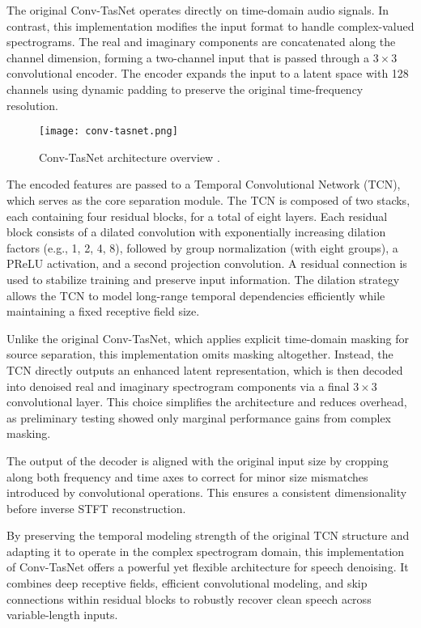 The original Conv-TasNet operates directly on time-domain audio signals. In contrast, this implementation modifies the input format to handle complex-valued spectrograms. The real and imaginary components are concatenated along the channel dimension, forming a two-channel input that is passed through a \(3 \times 3\) convolutional encoder. The encoder expands the input to a latent space with 128 channels using dynamic padding to preserve the original time-frequency resolution.

\begin{figure}[h]
    \centering
    \texttt{[image: conv-tasnet.png]}
    \caption{\label{fig:convtasnet}Conv-TasNet architecture overview \cite{luo2019conv}.}
\end{figure}

The encoded features are passed to a Temporal Convolutional Network (TCN), which serves as the core separation module. The TCN is composed of two stacks, each containing four residual blocks, for a total of eight layers. Each residual block consists of a dilated convolution with exponentially increasing dilation factors (e.g., 1, 2, 4, 8), followed by group normalization (with eight groups), a PReLU activation, and a second projection convolution. A residual connection is used to stabilize training and preserve input information. The dilation strategy allows the TCN to model long-range temporal dependencies efficiently while maintaining a fixed receptive field size.

Unlike the original Conv-TasNet, which applies explicit time-domain masking for source separation, this implementation omits masking altogether. Instead, the TCN directly outputs an enhanced latent representation, which is then decoded into denoised real and imaginary spectrogram components via a final \(3 \times 3\) convolutional layer. This choice simplifies the architecture and reduces overhead, as preliminary testing showed only marginal performance gains from complex masking.

The output of the decoder is aligned with the original input size by cropping along both frequency and time axes to correct for minor size mismatches introduced by convolutional operations. This ensures a consistent dimensionality before inverse STFT reconstruction.

By preserving the temporal modeling strength of the original TCN structure and adapting it to operate in the complex spectrogram domain, this implementation of Conv-TasNet offers a powerful yet flexible architecture for speech denoising. It combines deep receptive fields, efficient convolutional modeling, and skip connections within residual blocks to robustly recover clean speech across variable-length inputs.

